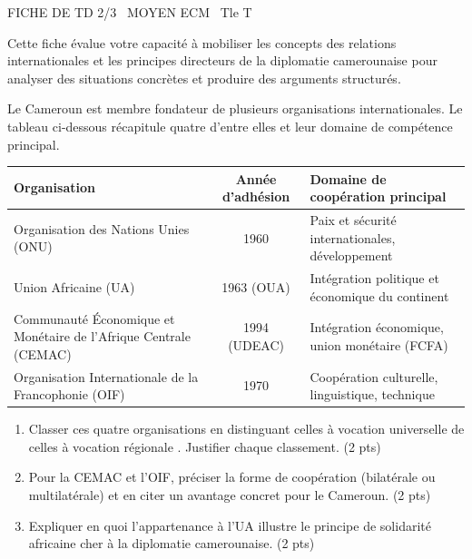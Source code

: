 \documentclass[11pt]{article}
\begin{document}
\begin{tcolorbox}[enhanced,colback=popink,colframe=popink,arc=10pt,boxrule=0pt,left=12pt,right=12pt,top=9pt,bottom=9pt]
{\color{white}\popxbold\small FICHE DE TD 2/3 \textbullet\ MOYEN \hfill ECM \textbullet\ Tle T\par}
\end{tcolorbox}
\vspace{4pt}
\noindent Cette fiche évalue votre capacité à mobiliser les concepts des relations internationales et les principes directeurs de la diplomatie camerounaise pour analyser des situations concrètes et produire des arguments structurés.

\begin{exercice}
Le Cameroun est membre fondateur de plusieurs organisations internationales. Le tableau ci-dessous récapitule quatre d'entre elles et leur domaine de compétence principal.

\begin{tabularx}{\linewidth}{|X|c|X|}
\hline
\textbf{Organisation} & \textbf{Année d'adhésion} & \textbf{Domaine de coopération principal} \\
\hline
Organisation des Nations Unies (ONU) & 1960 & Paix et sécurité internationales, développement \\
\hline
Union Africaine (UA) & 1963 (OUA) & Intégration politique et économique du continent \\
\hline
Communauté Économique et Monétaire de l'Afrique Centrale (CEMAC) & 1994 (UDEAC) & Intégration économique, union monétaire (FCFA) \\
\hline
Organisation Internationale de la Francophonie (OIF) & 1970 & Coopération culturelle, linguistique, technique \\
\hline
\end{tabularx}

\begin{enumerate}
    \item Classer ces quatre organisations en distinguant celles à vocation \og universelle \fg{} de celles à vocation \og régionale \fg. Justifier chaque classement. \hfill (2 pts)
    \item Pour la CEMAC et l'OIF, préciser la forme de coopération (bilatérale ou multilatérale) et en citer un avantage concret pour le Cameroun. \hfill (2 pts)
    \item Expliquer en quoi l'appartenance à l'UA illustre le principe de \og solidarité africaine \fg{} cher à la diplomatie camerounaise. \hfill (2 pts)
\end{enumerate}
\end{exercice}
\end{document}
